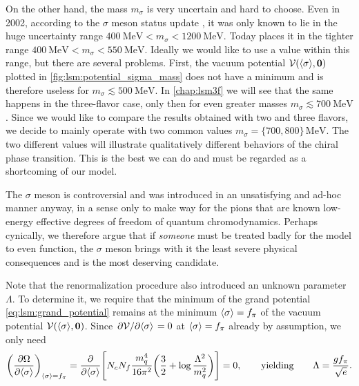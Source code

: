 On the other hand, the mass $m_\sigma$ is very uncertain and hard to choose.
Even in 2002, according to the $\sigma$ meson status update \cite{ref:sigma_meson_status},
it was only known to lie in the huge uncertainty range $\SI{400}{\mega\electronvolt} < m_\sigma < \SI{1200}{\mega\electronvolt}$.
Today \cite{ref:pdg_review_2021} places it in the tighter range $\SI{400}{\mega\electronvolt} < m_\sigma < \SI{550}{\mega\electronvolt}$.
Ideally we would like to use a value within this range, but there are several problems.
First, the vacuum potential $\mathcal{V}(\langle \sigma \rangle,{\bm{0}})$ plotted in \cref{fig:lsm:potential_sigma_mass} does not have a minimum and is therefore useless for $m_\sigma \lesssim \SI{500}{\mega\electronvolt}$.
In \cref{chap:lsm3f} we will see that the same happens in the three-flavor case, only then for even greater masses $m_\sigma \lesssim \SI{700}{\mega\electronvolt}$.
Since we would like to compare the results obtained with two and three flavors,
we decide to mainly operate with two common values $m_\sigma = \{700,800\} \, \si{\mega\electronvolt}$.
The two different values will illustrate qualitatively different behaviors of the chiral phase transition.
This is the best we can do and must be regarded as a shortcoming of our model.

The $\sigma$ meson is controversial and was introduced in an unsatisfying and ad-hoc manner anyway,
in a sense only to make way for the pions that are known low-energy effective degrees of freedom of quantum chromodynamics.
Perhaps cynically, we therefore argue that if \emph{someone} must be treated badly for the model to even function,
the $\sigma$ meson brings with it the least severe physical consequences and is the most deserving candidate.

Note that the renormalization procedure also introduced an unknown parameter $\Lambda$.
To determine it, we require that the minimum of the grand potential \eqref{eq:lsm:grand_potential}
remains at the minimum $\langle \sigma \rangle = f_\pi$ of the vacuum potential $\mathcal{V}(\langle \sigma \rangle,{\bm{0}})$.
Since $\pdv{\mathcal{V}}/{\langle \sigma \rangle} = 0$ at $\langle \sigma \rangle=f_\pi$ already by assumption, we only need
\begin{equation}
	\pdv{\Omega}{ \langle \sigma \rangle}_{\langle \sigma \rangle=f_\pi} =
	\pdv*{\Bigg[ N_c N_f \frac{m_q^4}{16 \pi^2} \bigg( \frac32 + \log \frac{\Lambda^2}{m_q^2} \bigg) \Bigg] }{\langle \sigma \rangle} = 0,
	\qquad \text{yielding} \qquad
	\Lambda = \frac{g f_\pi}{\sqrt{e}}.
\label{eq:lsm:potential_vacuum_minimum}
\end{equation}

